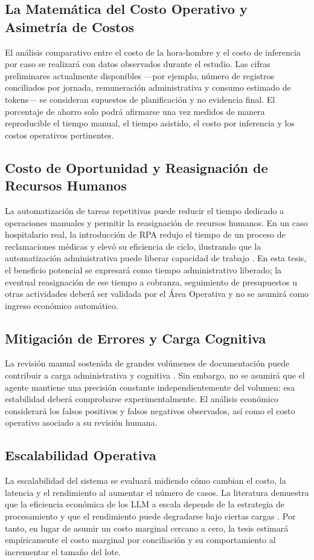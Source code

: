 \subsection{La Matemática del Costo Operativo y Asimetría de Costos}
El análisis comparativo entre el costo de la hora-hombre y el costo de inferencia por caso se realizará con datos observados durante el estudio. Las cifras preliminares actualmente disponibles ---por ejemplo, número de registros conciliados por jornada, remuneración administrativa y consumo estimado de tokens--- se consideran supuestos de planificación y no evidencia final. El porcentaje de ahorro solo podrá afirmarse una vez medidos de manera reproducible el tiempo manual, el tiempo asistido, el costo por inferencia y los costos operativos pertinentes.

\subsection{Costo de Oportunidad y Reasignación de Recursos Humanos}
La automatización de tareas repetitivas puede reducir el tiempo dedicado a operaciones manuales y permitir la reasignación de recursos humanos. En un caso hospitalario real, la introducción de RPA redujo el tiempo de un proceso de reclamaciones médicas y elevó su eficiencia de ciclo, ilustrando que la automatización administrativa puede liberar capacidad de trabajo \cite{huang2024rpa}. En esta tesis, el beneficio potencial se expresará como tiempo administrativo liberado; la eventual reasignación de ese tiempo a cobranza, seguimiento de presupuestos u otras actividades deberá ser validada por el Área Operativa y no se asumirá como ingreso económico automático.

\subsection{Mitigación de Errores y Carga Cognitiva}
La revisión manual sostenida de grandes volúmenes de documentación puede contribuir a carga administrativa y cognitiva \cite{murad2024burden}. Sin embargo, no se asumirá que el agente mantiene una precisión constante independientemente del volumen: esa estabilidad deberá comprobarse experimentalmente. El análisis económico considerará los falsos positivos y falsos negativos observados, así como el costo operativo asociado a su revisión humana.

\subsection{Escalabilidad Operativa}
La escalabilidad del sistema se evaluará midiendo cómo cambian el costo, la latencia y el rendimiento al aumentar el número de casos. La literatura demuestra que la eficiencia económica de los LLM a escala depende de la estrategia de procesamiento y que el rendimiento puede degradarse bajo ciertas cargas \cite{klang2024cost}. Por tanto, en lugar de asumir un costo marginal cercano a cero, la tesis estimará empíricamente el costo marginal por conciliación y su comportamiento al incrementar el tamaño del lote.
